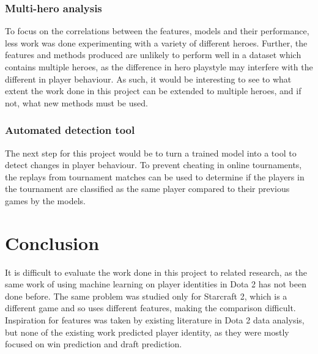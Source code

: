 \documentclass[Report.tex]{subfiles}
\begin{document}
\subsubsection{Multi-hero analysis}
To focus on the correlations between the features, models and their performance, less work was done experimenting with a variety of different heroes. Further, the features and methods produced are unlikely to perform well in a dataset which contains multiple heroes, as the difference in hero playstyle may interfere with the different in player behaviour. As such, it would be interesting to see to what extent the work done in this project can be extended to multiple heroes, and if not, what new methods must be used. 

\subsubsection{Automated detection tool}
The next step for this project would be to turn a trained model into a tool to detect changes in player behaviour. To prevent cheating in online tournaments, the replays from tournament matches can be used to determine if the players in the tournament are classified as the same player compared to their previous games by the models. 


\section{Conclusion}
It is difficult to evaluate the work done in this project to related research, as the same work of using machine learning on player identities in Dota 2 has not been done before. The same problem was studied only for Starcraft 2, which is a different game and so uses different features, making the comparison difficult. Inspiration for features was taken by existing literature in Dota 2 data analysis, but none of the existing work predicted player identity, as they were mostly focused on win prediction and draft prediction. 
\end{document}

